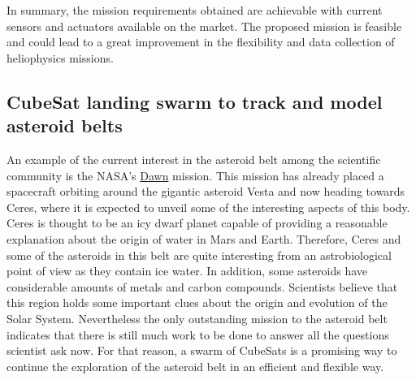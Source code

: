In summary, the mission requirements obtained are achievable with current
sensors and actuators available on the market. The proposed mission
is feasible and could lead to a great improvement in the flexibility
and data collection of heliophysics missions.


\subsection{CubeSat landing swarm to track and model asteroid belts}

An example of the current interest in the asteroid belt among the
scientific community is the NASA's \href{http://dawn.jpl.nasa.gov/mission/journal.asp}{Dawn} mission.
This mission has already placed a spacecraft orbiting around the gigantic
asteroid Vesta and now heading towards Ceres, where it is expected
to unveil some of the interesting aspects of this body. Ceres is thought to be
an icy dwarf planet capable of providing a reasonable explanation about
the origin of water in Mars and Earth. Therefore, Ceres and some of
the asteroids in this belt are quite interesting from an astrobiological
point of view as they contain ice water. In addition, some asteroids
have considerable amounts of metals and carbon compounds. Scientists believe
that this region holds some important clues about the origin and evolution
of the Solar System. Nevertheless the only outstanding mission to
the asteroid belt indicates that there is still much work to be done to answer
all the questions scientist ask now. For that reason, a swarm of CubeSats
is a promising way to continue the exploration of the asteroid belt
in an efficient and flexible way.

